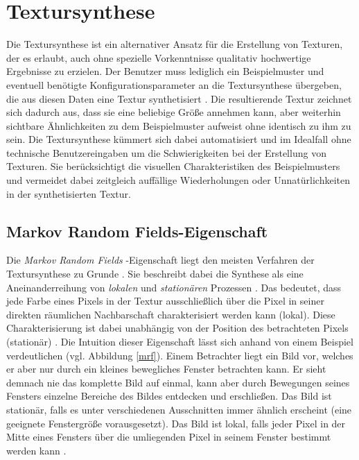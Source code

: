 \section{Textursynthese}

Die Textursynthese ist ein alternativer Ansatz für die Erstellung von Texturen, der es erlaubt, auch ohne spezielle Vorkenntnisse qualitativ hochwertige Ergebnisse zu erzielen.
Der Benutzer muss lediglich ein Beispielmuster und eventuell benötigte Konfigurationsparameter an die Textursynthese übergeben, die aus diesen Daten eine Textur synthetisiert \cite{StateOfTheArt}.
Die resultierende Textur zeichnet sich dadurch aus, dass sie eine beliebige Größe annehmen kann, aber weiterhin sichtbare Ähnlichkeiten zu dem Beispielmuster aufweist ohne identisch zu ihm zu sein.
Die Textursynthese kümmert sich dabei automatisiert und im Idealfall ohne technische Benutzereingaben um die Schwierigkeiten bei der Erstellung von Texturen.
Sie berücksichtigt die visuellen Charakteristiken des Beispielmusters und vermeidet dabei zeitgleich auffällige Wiederholungen oder Unnatürlichkeiten in der synthetisierten Textur.

\subsection{\glqq Markov Random Fields\grqq -Eigenschaft}

Die \emph{\glqq Markov Random Fields\grqq} -Eigenschaft liegt den meisten Verfahren der Textursynthese zu Grunde \cite{StateOfTheArt}.
Sie beschreibt dabei die Synthese als eine Aneinanderreihung von \emph{lokalen} und \emph{stationären} Prozessen \cite{StateOfTheArt}.
Das bedeutet, dass jede Farbe eines Pixels in der Textur ausschließlich über die Pixel in seiner direkten räumlichen Nachbarschaft charakterisiert werden kann (lokal).
Diese Charakterisierung ist dabei unabhängig von der Position des betrachteten Pixels (stationär) \cite{TextureOptimization}.
Die Intuition dieser Eigenschaft lässt sich anhand von einem Beispiel verdeutlichen (vgl. Abbildung \ref{mrf}).
Einem Betrachter liegt ein Bild vor, welches er aber nur durch ein kleines bewegliches Fenster betrachten kann.
Er sieht demnach nie das komplette Bild auf einmal, kann aber durch Bewegungen seines Fensters einzelne Bereiche des Bildes entdecken und erschließen.
Das Bild ist stationär, falls es unter verschiedenen Ausschnitten immer ähnlich erscheint (eine geeignete Fenstergröße vorausgesetzt).
Das Bild ist lokal, falls jeder Pixel in der Mitte eines Fensters über die umliegenden Pixel in seinem Fenster bestimmt werden kann \cite{StateOfTheArt}.

